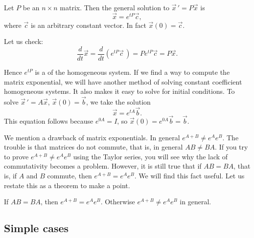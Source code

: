 \documentclass[12pt]{book}
\begin{document}
\begin{theorem}
Let $P$ be an $n \times n$ matrix.  Then the general solution to
${\vec{x}\,}' = P \vec{x}$ is
\begin{equation*}
\vec{x} = e^{tP} \vec{c} ,
\end{equation*}
where $\vec{c}$ is an arbitrary constant vector.  In fact $\vec{x}(0) =
\vec{c}$.
\end{theorem}

Let us check:
\begin{equation*}
\frac{d}{dt}
\vec{x} =
\frac{d}{dt} \left( 
e^{tP} \vec{c}\, \right)
=
P e^{tP} \vec{c} =
P \vec{x}.
\end{equation*}

Hence $e^{tP}$ is a 
of the homogeneous system.
If we find a way to compute the matrix exponential,
we will have another method of solving constant coefficient homogeneous
systems.  It also makes it easy to solve for initial conditions.  To solve 
${\vec{x}\,}' = A \vec{x}$, $\vec{x}(0) = \vec{b}$, we take the solution
\begin{equation*}
\vec{x} = e^{tA} \vec{b} .
\end{equation*}
This equation follows because $e^{0A} = I$,
so $\vec{x} (0) = e^{0A} \vec{b} = \vec{b}$.

\medskip

We mention a drawback of matrix exponentials.
In general $e^{A+B} \not= e^A e^B$.  The trouble is that matrices do
not commute, that is, in general $AB \not= BA$.
If you try to prove $e^{A+B} \not= e^A e^B$ using the Taylor series,
you will see why the lack of commutativity becomes a problem.
However, it is still true that if
$AB = BA$, that is, if $A$ and $B$ commute, then $e^{A+B} = e^Ae^B$.  We will
find this fact useful.  Let us restate this as a theorem to make a point.

\begin{theorem}
If $AB = BA$, then $e^{A+B} = e^Ae^B$.  Otherwise
$e^{A+B} \not= e^Ae^B$ in general.
\end{theorem}

\subsection{Simple cases}
\end{document}
